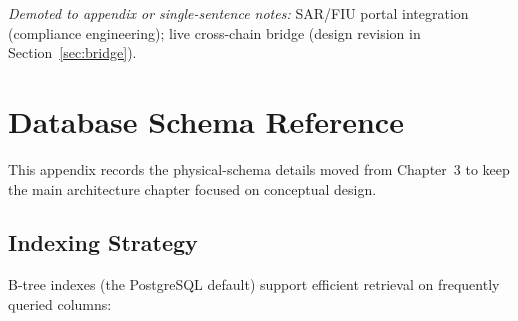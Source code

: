 \documentclass[12pt,a4paper]{report}
\begin{document}
\noindent\textit{Demoted to appendix or single-sentence notes:} SAR/FIU portal integration (compliance engineering); live cross-chain bridge (design revision in Section~\ref{sec:bridge}).


\appendix

\chapter{Database Schema Reference}
\label{app:db-schema-reference}

This appendix records the physical-schema details moved from Chapter~3 to keep the main architecture chapter focused on conceptual design.

\section{Indexing Strategy}

B-tree indexes (the PostgreSQL default) support efficient retrieval on frequently queried columns:
\end{document}
